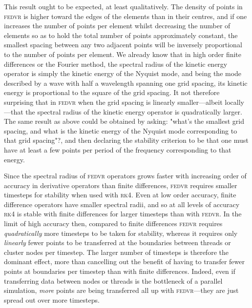 This result ought to be expected, at least qualitatively. The density of points in \textsc{fedvr} is higher toward the edges of the elements than in their centres, and if one increases the number of points per element whilst decreasing the number of elements so as to hold the total number of points approximately constant, the smallest spacing between any two adjacent points will be inversely proportional to the number of points per element. We already know that in high order finite differences or the Fourier method, the spectral radius of the kinetic energy operator is simply the kinetic energy of the Nyquist mode, and being the mode described by a wave with half a wavelength spanning one grid spacing, its kinetic energy is proportional to the square of the grid spacing. It not therefore surprising that in \textsc{fedvr} when the grid spacing is linearly smaller---albeit locally---that the spectral radius of the kinetic energy operator is quadratically larger. The same result as above could be obtained by asking: "what's the smallest grid spacing, and what is the kinetic energy of the Nyquist mode corresponding to that grid spacing"?, and then declaring the stability criterion to be that one must have at least a few points per period of the frequency corresponding to that energy.

Since the spectral radius of \textsc{fedvr} operators grows faster with increasing order of accuracy in derivative operators than finite differences, \textsc{fedvr} requires smaller timesteps for stability when used with \textsc{rk4}. Even at low order accuracy, finite difference operators have smaller spectral radii, and so at all levels of accuracy \textsc{rk4} is stable with finite differences for larger timesteps than with \textsc{fedvr}. In the limit of high accuracy then, compared to finite differences \textsc{fedvr} requires \emph{quadratically} more timesteps to be taken for stability, whereas it requires only \emph{linearly} fewer points to be transferred at the boundaries between threads or cluster nodes per timestep. The larger number of timesteps is therefore the dominant effect, more than cancelling out the benefit of having to transfer fewer points at boundaries per timestep than with finite differences. Indeed, even if transferring data between nodes or threads is the bottleneck of a parallel simulation, \emph{more} points are being transferred all up with \textsc{fedvr}---they are just spread out over more timesteps.

